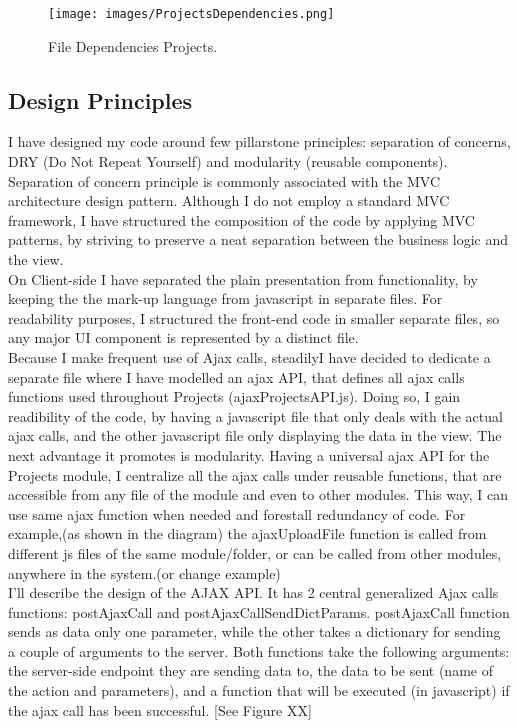 \begin{figure}
\texttt{[image: images/ProjectsDependencies.png]}
\caption{File Dependencies Projects.}
\label{fig:file_dependencies_projects}
\end{figure}

\subsection{Design Principles}

I have designed my code around few pillarstone principles: separation of concerns, DRY (Do Not Repeat Yourself) and modularity (reusable components). Separation of concern principle is commonly associated with the MVC architecture design pattern. Although I do not employ a standard MVC framework, I have structured the composition of the code by applying MVC patterns, by striving to preserve a neat separation between the business logic and the view.\\ 

On Client-side I have separated the plain presentation from functionality, by keeping the the mark-up language from javascript in separate files. For readability purposes, I structured the front-end code in smaller separate files, so any major UI component is represented by a distinct file.\\ 

Because I make frequent use of Ajax calls, steadilyI have decided to dedicate a separate file where I have modelled an ajax API, that defines all ajax calls functions used throughout Projects (ajaxProjectsAPI.js). Doing so, I gain readibility of the code, by having a javascript file that only deals with the actual ajax calls, and the other javascript file only displaying the data in the view. The next advantage it promotes is modularity. Having a universal ajax API for the Projects module, I centralize all the ajax calls under reusable functions, that are accessible from any file of the module and even to other modules. This way, I can use same ajax function when needed and forestall redundancy of code.
For example,(as shown in the diagram) the ajaxUploadFile function is called from different js files of the same module/folder, or can be called from other modules, anywhere in the system.(or change example)\\ 

I'll describe the design of the AJAX API. It has 2 central generalized Ajax calls functions: postAjaxCall and postAjaxCallSendDictParams. postAjaxCall function sends as data only one parameter, while the other takes a dictionary for sending a couple of arguments to the server.
Both functions take the following arguments: the server-side endpoint they are sending data to, the data to be sent (name of the action and parameters), and a function that will be executed (in javascript) if the ajax call has been successful. [See Figure XX] \\ 

